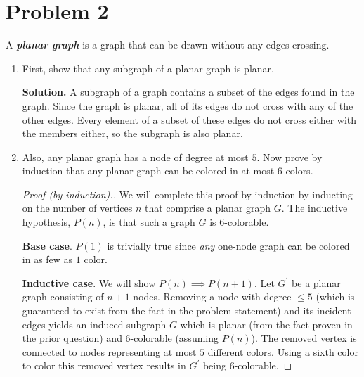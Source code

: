 \documentclass[a4paper]{article}
\begin{document}
	\section{Problem 2}%
	\label{sec:Problem 2}

	A \textbf{\textit{planar graph}} is a graph that can be drawn without any edges crossing.

	\begin{enumerate}
	\setlength\parskip{12pt}
		\item First, show that any subgraph of a planar graph is planar.

			\textbf{Solution.} A subgraph of a graph contains a subset of the edges
			found in the graph. Since the graph is planar, all of its edges do not
			cross with any of the other edges. Every element of a subset of these
			edges do not cross either with the members either, so the subgraph is
			also planar.

		\item Also, any planar graph has a node of degree at most $5$. Now prove by
			induction that any planar graph can be colored in at most $6$ colors.

	\begin{proof}[Proof (by induction).]

		We will complete this proof by induction by inducting on the number of
		vertices $n$ that comprise a planar graph $G$. The inductive hypothesis,
		$P(n)$, is that such a graph $G$ is $6$-colorable.

		\textbf{Base case}. $P(1)$ is trivially true since \textit{any} one-node graph
		can be colored in as few as $1$ color.

		\textbf{Inductive case}. We will show $P(n) \implies P(n+1)$. Let
		$G^{\prime}$ be a planar graph consisting of $n + 1$ nodes. Removing a node
		with degree $\leq 5$ (which is guaranteed to exist from the fact in the
		problem statement) and its incident edges yields an induced subgraph $G$
		which is planar (from the fact proven in the prior question) and
		$6$-colorable (assuming $P(n)$).  The removed vertex is connected to nodes
		representing at most $5$ different colors. Using a sixth color to color this
		removed vertex results in $G^{\prime}$ being $6$-colorable.

	\end{proof}

	\end{enumerate}
\end{document}
